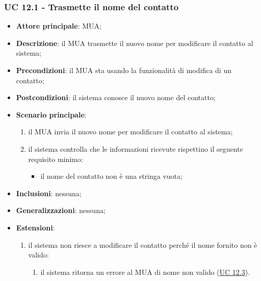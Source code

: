\subsubsection{UC 12.1 - Trasmette il nome del contatto} \label{sec:UC12.1}
    \begin{itemize}
        \item \textbf{Attore principale}: MUA;
        \item \textbf{Descrizione}: il MUA trasmette il nuovo nome per modificare il contatto al sistema;
        \item \textbf{Precondizioni}: il MUA sta usando la funzionalità di modifica di un contatto;
        \item \textbf{Postcondizioni}: il sistema conosce il nuovo nome del contatto;
        \item \textbf{Scenario principale}:
            \begin{enumerate}
                \item il MUA invia il nuovo nome per modificare il contatto al sistema;
                \item il sistema controlla che le informazioni ricevute rispettino il seguente requisito minimo:
                    \begin{itemize}
                        \item il nome del contatto non è una stringa vuota;
                    \end{itemize}
            \end{enumerate}
        \item \textbf{Inclusioni}: nessuna;
        \item \textbf{Generalizzazioni}: nessuna;
        \item \textbf{Estensioni}:
            \begin{enumerate}[label=\alph*.]
                \item il sistema non riesce a modificare il contatto perché il nome fornito non è valido:
                \begin{enumerate}[label=\arabic*.]
                    \item il sistema ritorna un errore al MUA di nome non valido (\hyperref[sec:UC12.3]{UC 12.3}).
                \end{enumerate}
            \end{enumerate}
    \end{itemize}


